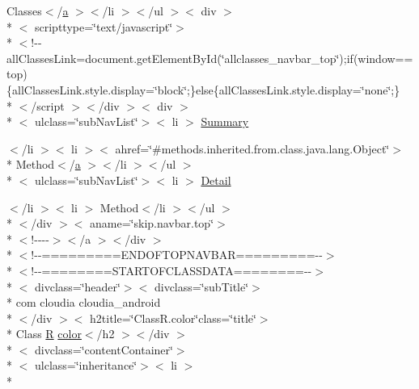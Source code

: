 \begin{DoxyCompactItemize}
\item 
Classes$<$/\hyperlink{style_8css_a5e8981582017bb8b84c21f148345d1f7}{a} $>$$<$/li $>$$<$/ul $>$$<$ div $>$\\*
$<$ scripttype=\char`\"{}text/javascript\char`\"{}$>$\\*
$<$!-\/-\/all\-Classes\-Link=document.\-get\-Element\-By\-Id(\char`\"{}allclasses\-\_\-navbar\-\_\-top\char`\"{});if(window==top)\{all\-Classes\-Link.\-style.\-display=\char`\"{}block\char`\"{};\}else\{all\-Classes\-Link.\-style.\-display=\char`\"{}none\char`\"{};\}\\*
$<$/script $>$$<$/div $>$$<$ div $>$\\*
$<$ ulclass=\char`\"{}sub\-Nav\-List\char`\"{}$>$$<$ li $>$ \hyperlink{_r_8color_8html_a6f9ab45abc9b0679dc1b132fbacfc681}{Summary}
\item 
$<$/li $>$$<$ li $>$$<$ ahref=\char`\"{}\#methods.\-inherited.\-from.\-class.\-java.\-lang.\-Object\char`\"{}$>$\\*
 Method$<$/\hyperlink{style_8css_a5e8981582017bb8b84c21f148345d1f7}{a} $>$$<$/li $>$$<$/ul $>$\\*
$<$ ulclass=\char`\"{}sub\-Nav\-List\char`\"{}$>$$<$ li $>$ \hyperlink{_r_8color_8html_aed0df2ae11502bf9389ac3cf53b1c0f6}{Detail}
\item 
$<$/li $>$$<$ li $>$ Method$<$/li $>$$<$/ul $>$\\*
$<$/div $>$$<$ aname=\char`\"{}skip.\-navbar.\-top\char`\"{}$>$\\*
$<$!-\/-\/-\/-\/$>$$<$/a $>$$<$/div $>$\\*
$<$!-\/-\/=========E\-N\-D\-O\-F\-T\-O\-P\-N\-A\-V\-B\-A\-R=========-\/-\/$>$\\*
$<$!-\/-\/========S\-T\-A\-R\-T\-O\-F\-C\-L\-A\-S\-S\-D\-A\-T\-A========-\/-\/$>$\\*
$<$ divclass=\char`\"{}header\char`\"{}$>$$<$ divclass=\char`\"{}sub\-Title\char`\"{}$>$\\*
 com cloudia cloudia\-\_\-android\\*
$<$/div $>$$<$ h2title=\char`\"{}Class\-R.\-color\char`\"{}class=\char`\"{}title\char`\"{}$>$\\*
 Class \hyperlink{index-16_8html_a31e8fe59be5c20ce90a0090e28a0c1fe}{R} \hyperlink{index-3_8html_a1491993f9d93ab4bc0fdec8302f292a3}{color}$<$/h2 $>$$<$/div $>$\\*
$<$ divclass=\char`\"{}content\-Container\char`\"{}$>$\\*
$<$ ulclass=\char`\"{}inheritance\char`\"{}$>$$<$ li $>$\\*

\end{DoxyCompactItemize}
